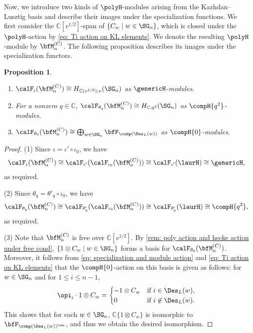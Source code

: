 \documentclass[12pt, reqno]{amsart}
\theoremstyle{plain}
\newtheorem{proposition}[proposition]{Proposition}
\theoremstyle{definition}
\numberwithin{equation}{section}
\numberwithin{figure}{section}
\numberwithin{table}{section}
\def\C{\mathbb C}
\begin{document}
Now, we introduce two kinds of $\polyH$-modules arising from the Kazhdan--Lusztig basis and describe their images under the specialization functions.
We first consider the $\C[v^{1/2}]$-span of $\{C_w \mid w\in\SG_n\}$, which is closed under the $\polyH$-action by \cref{eq: Ti action on KL elements}.
We denote the resulting $\polyH$-module by $\bfM^{(C)}_n$.
The following proposition describes its images under the specialization functors.
\begin{proposition}\label{lem: Cn isom to regular and simples}
\begin{enumerate}[label = {\rm (\arabic*)}]
    \item $\calF_{\iota} (\bfM^{(C)}_n) \cong H_{\C(v^{1/2});v}(\SG_n)$  as $\genericH$-modules.
    \item For a nonzero $q \in \C$, $\calF_{\theta_q} (\bfM^{(C)}_n) \cong H_{\C; q^2}(\SG_n)$  as $\compH{q^2}$-modules.
    \item $\calF_{\theta_0}(\bfM^{(C)}_n) \cong \bigoplus_{w \in \SG_n} \bfF_{\comp(\Des_L(w))}$ as $\compH{0}$-modules.
\end{enumerate}
\end{proposition}
\begin{proof}
(1) Since $\iota = \iota' \circ \iota_0$, we have
\[
\calF_{\iota}(\bfM^{(C)}_n) \cong \calF_{\iota'}(\calF_{\iota_0}(\bfM^{(C)}_n))\cong \calF_{\iota'}(\laurH) \cong \genericH,
\]
as required.



(2) Since $\theta_q = \theta'_q \circ \iota_0$, we have 
\[
\calF_{\theta_q}(\bfM^{(C)}_n) \cong \calF_{\theta'_q}(\calF_{\iota_0}(\bfM^{(C)}_n))\cong \calF_{\theta'_q}(\laurH) \cong \compH{q^2},
\]
as required.


(3) Note that $\bfM^{(C)}_n$ is free over $\C[v^{1/2}]$.
By \cref{rem: poly action and hecke action under free cond}, $\{1 \otimes C_w \mid w \in \SG_n \}$ forms a basis for $\calF_{\theta_0}(\bfM^{(C)}_n)$.
Moreover, it follows from \cref{eq: specialization and module action} and \cref{eq: Ti action on KL elements}  that the $\compH{0}$-action on this basis  is given as follows: for $w \in \SG_n$  and for $1 \leq i \leq n-1$,
\begin{align}\label{eq: F_o Mcn action}
\opi_i \cdot 1 \otimes C_w = \begin{cases}
- 1 \otimes C_w & \text{if $i \in \Des_L(w)$},\\
0 & \text{if $i \not\in \Des_L(w)$}.
\end{cases}
\end{align}
This shows that for each $w \in \SG_n$, $\C\{1 \otimes C_w\}$ is isomorphic to $\bfF_{\comp(\Des_L(w))^\rmc}$, and thus we obtain the desired isomorphism.
\end{proof}
\end{document}
